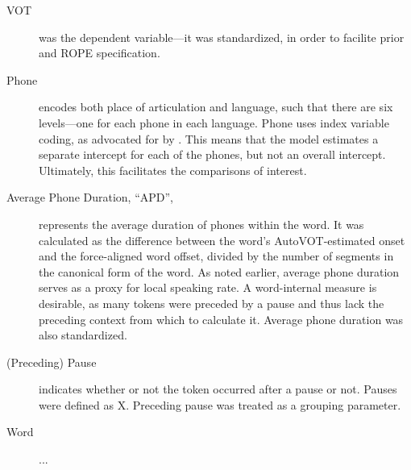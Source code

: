 \begin{description}
  \item[VOT] was the dependent variable---it was standardized, in order to facilite prior and ROPE specification. 
  \item[Phone] encodes both place of articulation and language, such that there are six levels---one for each phone in each language. Phone uses index variable coding, as advocated for by \citet{mcelreath_2020_sr}. This means that the model estimates a separate intercept for each of the phones, but not an overall intercept. Ultimately, this facilitates the comparisons of interest.  
  \item[Average Phone Duration, ``APD'',] represents the average duration of phones within the word. It was calculated as the difference between the word's AutoVOT-estimated onset and the force-aligned word offset, divided by the number of segments in the canonical form of the word. As noted earlier, average phone duration serves as a proxy for local speaking rate. A word-internal measure is desirable, as many tokens were preceded by a pause and thus lack the preceding context from which to calculate it. Average phone duration was also standardized. 
  \item[(Preceding) Pause] indicates whether or not the token occurred after a pause or not. Pauses were defined as X. Preceding pause was treated as a grouping parameter.
  \item[Word] ... 
\end{description}




